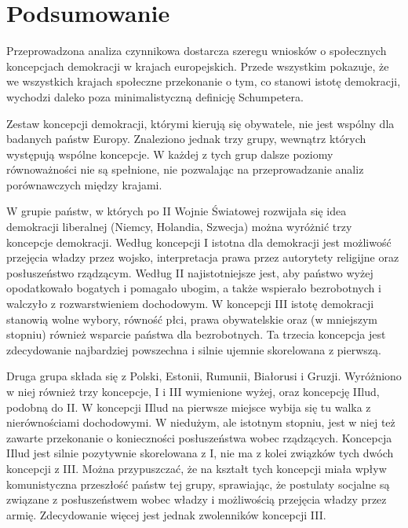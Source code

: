 \documentclass[12pt]{article}
\begin{document}
\hypertarget{podsumowanie}{%
\section{Podsumowanie}\label{podsumowanie}}

Przeprowadzona analiza czynnikowa dostarcza szeregu wniosków o społecznych koncepcjach demokracji w krajach europejskich. Przede wszystkim pokazuje, że we wszystkich krajach społeczne przekonanie o tym, co stanowi istotę demokracji, wychodzi daleko poza minimalistyczną definicję Schumpetera.

Zestaw koncepcji demokracji, którymi kierują się obywatele, nie jest wspólny dla badanych państw Europy. Znaleziono jednak trzy grupy, wewnątrz których występują wspólne koncepcje. W każdej z tych grup dalsze poziomy równoważności nie są spełnione, nie pozwalając na przeprowadzanie analiz porównawczych między krajami.

W grupie państw, w których po II Wojnie Światowej rozwijała się idea demokracji liberalnej (Niemcy, Holandia, Szwecja) można wyróżnić trzy koncepcje demokracji. Według koncepcji I istotna dla demokracji jest możliwość przejęcia władzy przez wojsko, interpretacja prawa przez autorytety religijne oraz posłuszeństwo rządzącym. Według II najistotniejsze jest, aby państwo wyżej opodatkowało bogatych i pomagało ubogim, a także wspierało bezrobotnych i walczyło z rozwarstwieniem dochodowym. W koncepcji III istotę demokracji stanowią wolne wybory, równość płci, prawa obywatelskie oraz (w mniejszym stopniu) również wsparcie państwa dla bezrobotnych. Ta trzecia koncepcja jest zdecydowanie najbardziej powszechna i silnie ujemnie skorelowana z pierwszą.

Druga grupa składa się z Polski, Estonii, Rumunii, Białorusi i Gruzji. Wyróżniono w niej również trzy koncepcje, I i III wymienione wyżej, oraz koncepcję IIlud, podobną do II. W koncepcji IIlud na pierwsze miejsce wybija się tu walka z nierównościami dochodowymi. W niedużym, ale istotnym stopniu, jest w niej też zawarte przekonanie o konieczności posłuszeństwa wobec rządzących. Koncepcja IIlud jest silnie pozytywnie skorelowana z I, nie ma z kolei związków tych dwóch koncepcji z III. Można przypuszczać, że na kształt tych koncepcji miała wpływ komunistyczna przeszłość państw tej grupy, sprawiając, że postulaty socjalne są związane z posłuszeństwem wobec władzy i możliwością przejęcia władzy przez armię. Zdecydowanie więcej jest jednak zwolenników koncepcji III.
\end{document}
